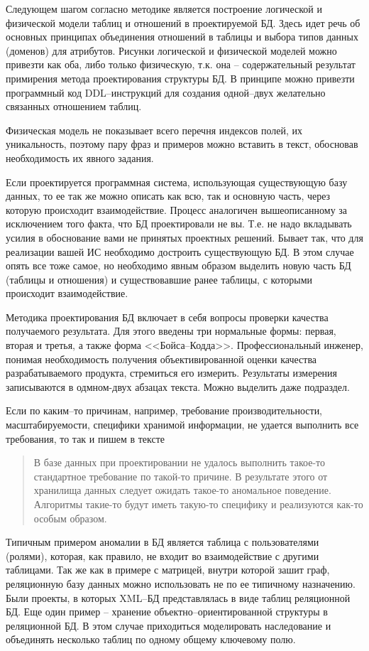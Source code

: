 \documentclass[a4paper,14pt,final]{extreport}
\begin{document}
Следующем шагом согласно методике является построение логической и физической модели таблиц и отношений в проектируемой БД.  Здесь идет речь об основных принципах объединения отношений в таблицы и выбора типов данных (доменов) для атрибутов.  Рисунки логической и физической моделей можно привезти как оба, либо только физическую, т.к. она -- содержательный результат примирения метода проектирования структуры БД.  В принципе можно привезти программный код DDL--инструкций для создания одной--двух желательно связанных отношением таблиц.

Физическая модель не показывает всего перечня индексов полей, их уникальность, поэтому пару фраз и примеров можно вставить в текст, обосновав необходимость их явного задания.

Если проектируется программная система, использующая существующую базу данных, то ее так же можно описать как всю, так и основную часть, через которую происходит взаимодействие.  Процесс аналогичен вышеописанному за исключением того факта, что БД проектировали не вы. Т.е. не надо вкладывать усилия в обоснование вами не принятых проектных решений.  Бывает так, что для реализации вашей ИС необходимо достроить существующую БД.  В этом случае опять все тоже самое, но необходимо явным образом выделить новую часть БД (таблицы и отношения) и существовавшие ранее таблицы, с которыми происходит взаимодействие.

Методика проектирования БД включает в себя вопросы проверки качества получаемого результата.  Для этого введены три нормальные формы: первая, вторая и третья, а также форма <<Бойса--Кодда>>.  Профессиональный инженер, понимая необходимость получения объективированной оценки качества разрабатываемого продукта, стремиться его измерить.  Результаты измерения записываются в одмном-двух абзацах текста.  Можно выделить даже подраздел.

Если по каким--то причинам, например, требование производительности, масштабируемости, специфики хранимой информации, не удается выполнить все требования, то так и пишем в тексте
\begin{quote}
  В базе данных при проектировании не удалось выполнить такое-то стандартное требование по такой-то причине.  В результате этого от хранилища данных следует ожидать такое-то аномальное поведение.  Алгоритмы такие-то будут иметь такую-то специфику и реализуются как-то особым образом.
\end{quote}
Типичным примером аномалии в БД является таблица с пользователями (ролями), которая, как правило, не входит во взаимодействие с другими таблицами.  Так же как в примере с матрицей, внутри которой зашит граф, реляционную базу данных можно использовать не по ее типичному назначению.  Были проекты, в которых XML--БД представлялась в виде таблиц реляционной БД.  Еще один пример -- хранение объектно--ориентированной структуры в реляционной БД.  В этом случае приходиться моделировать наследование и объединять несколько таблиц по одному общему ключевому полю.
\end{document}
